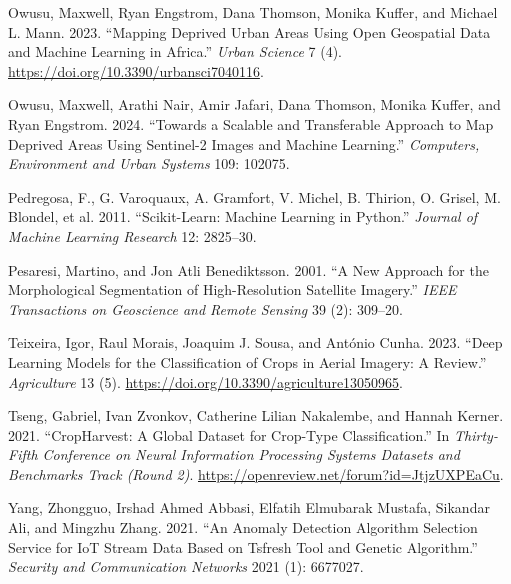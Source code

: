 \documentclass[
  journal,
  twocolumn]{IEEEtran}
\newlength{\cslhangindent}
\newlength{\cslentryspacingunit} %
\newenvironment{CSLReferences}[2] %
 {%
  \setlength{\parindent}{0pt}
  \ifodd #1
  \let\oldpar\par
  \def\par{\hangindent=\cslhangindent\oldpar}
  \fi
  \setlength{\parskip}{#2\cslentryspacingunit}
 }%
 {}
\begin{document}
\begin{CSLReferences}{1}{0}
\leavevmode{}%
Owusu, Maxwell, Ryan Engstrom, Dana Thomson, Monika Kuffer, and Michael
L. Mann. 2023. {``Mapping Deprived Urban Areas Using Open Geospatial
Data and Machine Learning in Africa.''} \emph{Urban Science} 7 (4).
\url{https://doi.org/10.3390/urbansci7040116}.

\leavevmode{}%
Owusu, Maxwell, Arathi Nair, Amir Jafari, Dana Thomson, Monika Kuffer,
and Ryan Engstrom. 2024. {``Towards a Scalable and Transferable Approach
to Map Deprived Areas Using Sentinel-2 Images and Machine Learning.''}
\emph{Computers, Environment and Urban Systems} 109: 102075.

\leavevmode{}%
Pedregosa, F., G. Varoquaux, A. Gramfort, V. Michel, B. Thirion, O.
Grisel, M. Blondel, et al. 2011. {``Scikit-Learn: Machine Learning in
{P}ython.''} \emph{Journal of Machine Learning Research} 12: 2825--30.

\leavevmode{}%
Pesaresi, Martino, and Jon Atli Benediktsson. 2001. {``A New Approach
for the Morphological Segmentation of High-Resolution Satellite
Imagery.''} \emph{IEEE Transactions on Geoscience and Remote Sensing} 39
(2): 309--20.

\leavevmode{}%
Teixeira, Igor, Raul Morais, Joaquim J. Sousa, and António Cunha. 2023.
{``Deep Learning Models for the Classification of Crops in Aerial
Imagery: A Review.''} \emph{Agriculture} 13 (5).
\url{https://doi.org/10.3390/agriculture13050965}.

\leavevmode{}%
Tseng, Gabriel, Ivan Zvonkov, Catherine Lilian Nakalembe, and Hannah
Kerner. 2021. {``CropHarvest: A Global Dataset for Crop-Type
Classification.''} In \emph{Thirty-Fifth Conference on Neural
Information Processing Systems Datasets and Benchmarks Track (Round 2)}.
\url{https://openreview.net/forum?id=JtjzUXPEaCu}.

\leavevmode{}%
Yang, Zhongguo, Irshad Ahmed Abbasi, Elfatih Elmubarak Mustafa, Sikandar
Ali, and Mingzhu Zhang. 2021. {``An Anomaly Detection Algorithm
Selection Service for IoT Stream Data Based on Tsfresh Tool and Genetic
Algorithm.''} \emph{Security and Communication Networks} 2021 (1):
6677027.

\end{CSLReferences}
\end{document}
